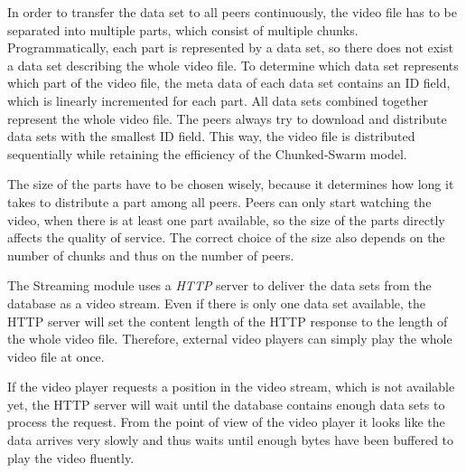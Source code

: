 In order to transfer the data set to all peers continuously, the video file has to be separated into multiple parts, which consist of multiple chunks. Programmatically, each part is represented by a data set, so there does not exist a data set describing the whole video file. To determine which data set represents which part of the video file, the meta data of each data set contains an ID field, which is linearly incremented for each part. All data sets combined together represent the whole video file. The peers always try to download and distribute data sets with the smallest ID field. This way, the video file is distributed sequentially while retaining the efficiency of the Chunked-Swarm model.

The size of the parts have to be chosen wisely, because it determines how long it takes to distribute a part among all peers. Peers can only start watching the video, when there is at least one part available, so the size of the parts directly affects the quality of service. The correct choice of the size also depends on the number of chunks and thus on the number of peers.

The Streaming module uses a \emph{HTTP} server to deliver the data sets from the database as a video stream. Even if there is only one data set available, the HTTP server will set the content length of the HTTP response to the length of the whole video file. Therefore, external video players can simply play the whole video file at once. 

\pagebreak

If the video player requests a position in the video stream, which is not available yet, the HTTP server will wait until the database contains enough data sets to process the request. From the point of view of the video player it looks like the data arrives very slowly and thus waits until enough bytes have been buffered to play the video fluently.
